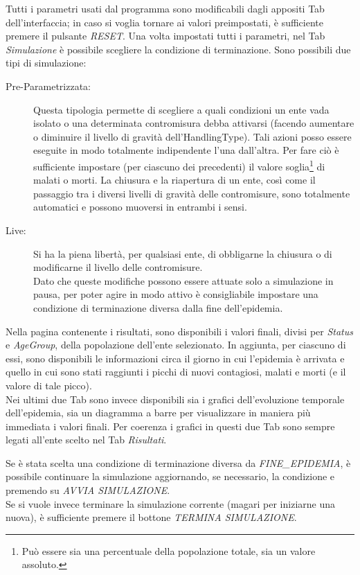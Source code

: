 \documentclass[a4paper, 12pt]{article}
\begin{document}
	Tutti i parametri usati dal programma sono modificabili dagli appositi Tab dell'interfaccia; in caso si voglia tornare ai valori preimpostati, è sufficiente premere il pulsante \emph{RESET}.
	Una volta impostati tutti i parametri, nel Tab \emph{Simulazione} è possibile scegliere la condizione di terminazione.
	Sono possibili due tipi di simulazione:
	\begin{description}
		\item[Pre-Parametrizzata:] Questa tipologia permette di scegliere a quali condizioni un ente vada isolato o una determinata contromisura debba attivarsi (facendo aumentare o diminuire il livello di gravità dell'HandlingType).
		Tali azioni posso essere eseguite in modo totalmente indipendente l'una dall'altra.
		Per fare ciò è sufficiente impostare (per ciascuno dei precedenti) il valore soglia\footnote{Può essere sia una percentuale della popolazione totale, sia un valore assoluto.} di malati o morti.
		La chiusura e la riapertura di un ente, così come il passaggio tra i diversi livelli di gravità delle contromisure, sono totalmente automatici e possono muoversi in entrambi i sensi.
		\item[Live:] Si ha la piena libertà, per qualsiasi ente, di obbligarne la chiusura o di modificarne il livello delle contromisure.\\
		Dato che queste modifiche possono essere attuate solo a simulazione in pausa, per poter agire in modo attivo è consigliabile impostare una condizione di terminazione diversa dalla fine dell'epidemia.
	\end{description}

	Nella pagina contenente i risultati, sono disponibili i valori finali, divisi per \emph{Status} e \emph{AgeGroup}, della popolazione dell'ente selezionato. In aggiunta, per ciascuno di essi, sono disponibili le informazioni circa il giorno in cui l'epidemia è arrivata e quello in cui sono stati raggiunti i picchi di nuovi contagiosi, malati e morti (e il valore di tale picco).\\
	Nei ultimi due Tab sono invece disponibili sia i grafici dell'evoluzione temporale dell'epidemia, sia un diagramma a barre per visualizzare in maniera più immediata i valori finali. Per coerenza i grafici in questi due Tab sono sempre legati all'ente scelto nel Tab \emph{Risultati}.

	Se è stata scelta una condizione di terminazione diversa da \emph{FINE\_EPIDEMIA}, è possibile continuare la simulazione aggiornando, se necessario, la condizione e premendo su \emph{AVVIA SIMULAZIONE}.\\
	Se si vuole invece terminare la simulazione corrente (magari per iniziarne una nuova), è sufficiente premere il bottone \emph{TERMINA SIMULAZIONE}.
	
\end{document}
